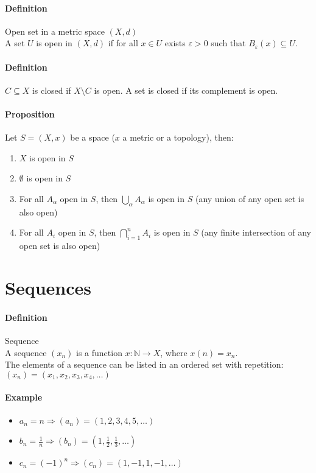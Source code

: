 \documentclass{article}
\newcommand{\func}[3]{#1 : #2 \rightarrow #3}
\newcommand{\N}{\mathbb{N}}
\newcommand{\Ep}{\varepsilon}
\newcommand{\Def}{\paragraph{Definition}}
\newcommand{\Proposition}{\paragraph{Proposition}}
\newcommand{\Example}{\paragraph{Example}}
\begin{document}
  \Def Open set in a metric space $(X, d)$
\\A set $U$ is open in $(X, d)$ if for all $x \in U$ exists $\Ep > 0$ such
  that $B_\Ep(x) \subseteq U$.

  \Def $C \subseteq X$ is closed if $X\setminus C$ is open. A set is closed if
  its complement is open.

  \Proposition Let $S = (X, x)$ be a space ($x$ a metric or a topology), then:
  \begin{enumerate}[label=(\roman*)]
    \item $X$ is open in $S$
    \item $\emptyset$ is open in $S$
    \item For all $A_\alpha$ open in $S$, then $\displaystyle \bigcup_\alpha
    A_\alpha$ is open in $S$ (any union of any open set is also open)
    \item For all $A_i$ open in $S$, then $\displaystyle \bigcap_{i=1}^n
    A_i$ is open in $S$ (any finite intersection of any open set is also open)
  \end{enumerate}



\section{Sequences}

  \Def Sequence
\\A sequence $(x_n)$ is a function $\func{x}{\N}{X}$, where $x(n) = x_n$.
\\The elements of a sequence can be listed in an ordered set with repetition:
  $(x_n) = (x_1, x_2, x_3, x_4, \hdots)$

  \Example
  \begin{itemize}
    \item $a_n = n \Rightarrow (a_n) = (1, 2, 3, 4, 5, \hdots)$
    \item $b_n = \frac{1}{n} \Rightarrow (b_n) = (1, \frac{1}{2}, \frac{1}{3},
    \hdots)$
    \item $c_n = (-1)^n \Rightarrow (c_n) = (1, -1, 1, -1, \hdots)$
  \end{itemize}
\end{document}
